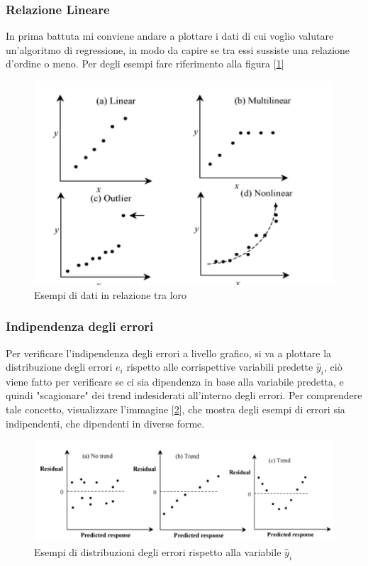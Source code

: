 \newpage
\subsubsection{Relazione Lineare}
In prima battuta mi conviene andare a plottare i dati di cui voglio valutare un'algoritmo di regressione, in modo da capire se tra essi sussiste una relazione d'ordine o meno. Per degli esempi fare riferimento alla figura [\ref{img:regression-relations}]

\begin{figure}[h]
\centering
\includegraphics[width=.7\textwidth]{img/chapter-5/regression-relations.png}
\caption{Esempi di dati in relazione tra loro}\label{img:regression-relations}
\end{figure}

\subsubsection{Indipendenza degli errori}
Per verificare l'indipendenza degli errori a livello grafico, si va a plottare la distribuzione degli errori \(e_i\) rispetto alle corrispettive variabili predette \(\hat{y}_i\), ciò viene fatto per verificare se ci sia dipendenza in base alla variabile predetta, e quindi "scagionare" dei trend indesiderati all'interno degli errori. Per comprendere tale concetto, visualizzare l'immagine [\ref{img:independent-errors}], che mostra degli esempi di errori sia indipendenti, che dipendenti in diverse forme.

\begin{figure}[h]
\centering
\includegraphics[width=.8\textwidth]{img/chapter-5/independet-errors.png}
\caption{Esempi di distribuzioni degli errori rispetto alla variabile \(\hat{y}_i\)}\label{img:independent-errors}
\end{figure}


